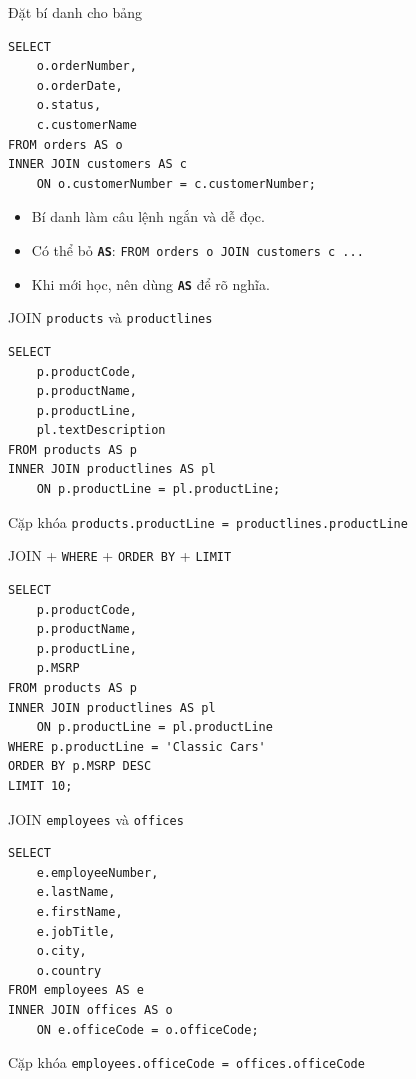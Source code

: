 \documentclass[aspectratio=169,11pt]{beamer}
\newcommand{\kw}[1]{\textbf{\texttt{#1}}}
\begin{document}
\begin{frame}[fragile]{Đặt bí danh cho bảng}
\begin{lstlisting}
SELECT
    o.orderNumber,
    o.orderDate,
    o.status,
    c.customerName
FROM orders AS o
INNER JOIN customers AS c
    ON o.customerNumber = c.customerNumber;
\end{lstlisting}
\begin{itemize}
  \item Bí danh làm câu lệnh ngắn và dễ đọc.
  \item Có thể bỏ \kw{AS}: \texttt{FROM orders o JOIN customers c ...}
  \item Khi mới học, nên dùng \kw{AS} để rõ nghĩa.
\end{itemize}
\end{frame}

\begin{frame}[fragile]{JOIN \texttt{products} và \texttt{productlines}}
\begin{lstlisting}
SELECT
    p.productCode,
    p.productName,
    p.productLine,
    pl.textDescription
FROM products AS p
INNER JOIN productlines AS pl
    ON p.productLine = pl.productLine;
\end{lstlisting}
\begin{block}{Cặp khóa}
\centering \texttt{products.productLine = productlines.productLine}
\end{block}
\end{frame}

\begin{frame}[fragile]{JOIN + \texttt{WHERE} + \texttt{ORDER BY} + \texttt{LIMIT}}
\begin{lstlisting}
SELECT
    p.productCode,
    p.productName,
    p.productLine,
    p.MSRP
FROM products AS p
INNER JOIN productlines AS pl
    ON p.productLine = pl.productLine
WHERE p.productLine = 'Classic Cars'
ORDER BY p.MSRP DESC
LIMIT 10;
\end{lstlisting}
\end{frame}

\begin{frame}[fragile]{JOIN \texttt{employees} và \texttt{offices}}
\begin{lstlisting}
SELECT
    e.employeeNumber,
    e.lastName,
    e.firstName,
    e.jobTitle,
    o.city,
    o.country
FROM employees AS e
INNER JOIN offices AS o
    ON e.officeCode = o.officeCode;
\end{lstlisting}
\begin{block}{Cặp khóa}
\centering \texttt{employees.officeCode = offices.officeCode}
\end{block}
\end{frame}
\end{document}
